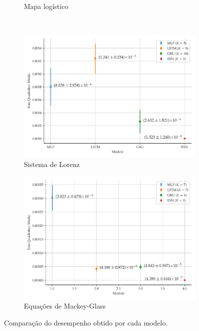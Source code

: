 \documentclass{beamer}
\begin{document}
\begin{frame}
\begin{figure}[!h]
\begin{subfigure}[t]{0.4\textwidth}
         \caption{Mapa logístico}
     \end{subfigure}
     \centering\\
     \begin{subfigure}[t]{0.4\textwidth}
     \centering
         \includegraphics[scale=0.15]{comparacao-k-lorenz.pdf}
         \caption{Sistema de Lorenz}
     \end{subfigure}
     \centering
     \begin{subfigure}[t]{0.4\textwidth} 
     \centering
         \includegraphics[scale=0.15]{comparacao-k-mackeyglass.pdf}
         \caption{Equações de Mackey-Glass}
     \end{subfigure}  
     \centering   
     \caption{Comparação do desempenho obtido por cada modelo.}
     \label{fig:model-comparison}
\end{figure}
\end{frame}
\end{document}
